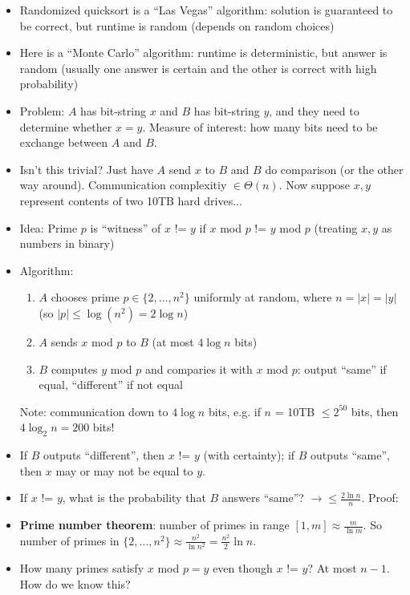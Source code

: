 \begin{itemize}
	\item Randomized quicksort is a ``Las Vegas'' algorithm: solution is guaranteed to be correct, but runtime is random (depends on random choices)
	\item Here is a ``Monte Carlo'' algorithm: runtime is deterministic, but answer is random (usually one answer is certain and the other is correct with high probability)
	\item Problem: $A$ has bit-string $x$ and $B$ has bit-string $y$, and they need to determine whether $x=y$. Measure of interest: how many bits need to be exchange between $A$ and $B$.
	\item Isn't this trivial? Just have $A$ send $x$ to $B$ and $B$ do comparison (or the other way around). Communication complexitiy $\in \Theta(n)$. Now suppose $x,y$ represent contents of two 10TB hard drives...
	\item Idea: Prime $p$ is ``witness'' of $x$ != $y$ if $x$ mod $p$ != $y$ mod $p$ (treating $x,y$ as numbers in binary)
	\item Algorithm:
		\begin{enumerate}[label={(\alph*)}]
			\item $A$ chooses prime $p \in \{2, \ldots, n^2\}$ uniformly at random, where $n = |x| = |y|$ (so $|p| \leq \log(n^2) = 2 \log n$)
			\item $A$ sends $x$ mod $p$ to $B$ (at most $4 \log n$ bits)
			\item $B$ computes $y$ mod $p$ and comparies it with $x$ mod $p$: output ``same'' if equal, ``different'' if not equal
 		\end{enumerate}
 		Note: communication down to $4 \log n$ bits, e.g. if $n$ = 10TB $\leq 2^{50}$ bits, then $4 \log_2 n = 200$ bits!
 	\item If $B$ outputs ``different'', then $x$ != $y$ (with certainty); if $B$ outputs ``same'', then $x$ may or may not be equal to $y$.
 	\item If $x$ != $y$, what is the probability that $B$ answers ``same''? $\rightarrow \leq \frac{2 \ln n}{n}$. Proof:
 	\item \textbf{Prime number theorem}: number of primes in range $[1,m] \approx \frac{m}{\ln m}$. So number of primes in $\{2,\ldots,n^2\} \approx \frac{n^2}{\ln n^2} = \frac{n^2}{2} \ln n$. 
 	\item How many primes satisfy $x$ mod $p = y$ even though $x$ != $y$? At most $n-1$. How do we know this? \\

\end{itemize}
